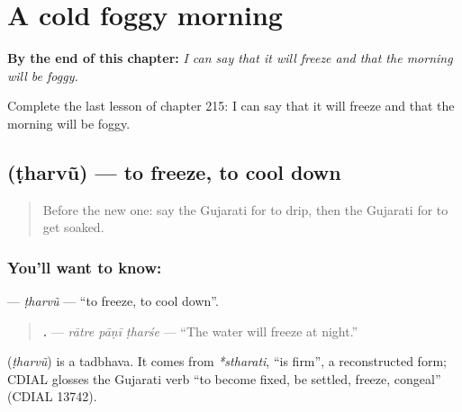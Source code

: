 
\chapter{A cold foggy morning}
\label{ch:gu-a-cold-foggy-morning}

\begin{chapteropening}
\textbf{By the end of this chapter:} \emph{I can say that it will freeze and that the morning will be foggy.}

Complete the last lesson of chapter 215: I can say that it will freeze and that the morning will be foggy.
\end{chapteropening}

\section[\texorpdfstring{\gu{ઠરવું} (ṭharvũ)}{ઠરવું (ṭharvũ)}]{ (ṭharvũ) — to freeze, to cool down}

\label{lesson:GU-C215-tharvu}



\begin{quote}
Before the new one: say the Gujarati for to drip, then the Gujarati for to get soaked.
\end{quote}

\subsection*{You'll want to know: }
\textbf{} — \emph{ṭharvũ} — \textquotedblleft{}to freeze, to cool down\textquotedblright{}.

\begin{quote}
\textbf{  .} — \emph{rātre pāṇī ṭharśe} — \textquotedblleft{}The water will freeze at night.\textquotedblright{}
\end{quote}

\begin{cousinweb}
\textbf{} (\emph{ṭharvũ}) is a tadbhava. It comes from \emph{*stharati}, \textquotedblleft{}is firm\textquotedblright{}, a reconstructed form; CDIAL glosses the Gujarati verb \textquotedblleft{}to become fixed, be settled, freeze, congeal\textquotedblright{} (CDIAL 13742).
\end{cousinweb}

